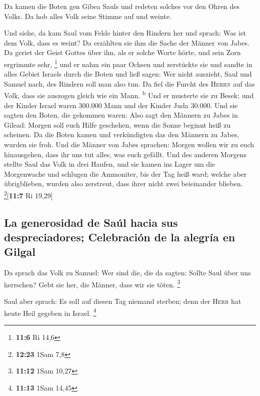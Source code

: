  Da kamen die Boten gen Gibea Sauls und redeten solches
vor den Ohren des Volks. Da hob alles Volk seine Stimme auf und weinte.

 Und siehe, da kam Saul vom Felde hinter den Rindern her
und sprach: Was ist dem Volk, dass es weint? Da erzählten sie ihm die
Sache der Männer von Jabes.  Da geriet der Geist Gottes
über ihn, als er solche Worte hörte, und sein Zorn ergrimmte sehr,
\footnote{\textbf{11:6} Ri 14,6}  und er nahm ein paar
Ochsen und zerstückte sie und sandte in alles Gebiet Israels durch die
Boten und ließ sagen: Wer nicht auszieht, Saul und Samuel nach, des
Rindern soll man also tun. Da fiel die Furcht des \textsc{Herrn} auf das
Volk, dass sie auszogen gleich wie ein Mann. \textsuperscript{b}
 Und er musterte sie zu Besek; und der Kinder Israel waren
300.000 Mann und der Kinder Juda 30.000.  Und sie sagten
den Boten, die gekommen waren: Also sagt den Männern zu Jabes in Gilead:
Morgen soll euch Hilfe geschehen, wenn die Sonne beginnt heiß zu
scheinen. Da die Boten kamen und verkündigten das den Männern zu Jabes,
wurden sie froh.  Und die Männer von Jabes sprachen:
Morgen wollen wir zu euch hinausgehen, dass ihr uns tut alles, was euch
gefällt.  Und des anderen Morgens stellte Saul das Volk
in drei Haufen, und sie kamen ins Lager um die Morgenwache und schlugen
die Ammoniter, bis der Tag heiß ward; welche aber übrigblieben, wurden
also zerstreut, dass ihrer nicht zwei beieinander blieben.
\footnote{\textbf{12:23} 1Sam 7,8}{[}\textbf{11:7} Ri 19,29{]}

\hypertarget{la-generosidad-de-sauxfal-hacia-sus-despreciadores-celebraciuxf3n-de-la-alegruxeda-en-gilgal}{%
\subsection{La generosidad de Saúl hacia sus despreciadores; Celebración
de la alegría en
Gilgal}\label{la-generosidad-de-sauxfal-hacia-sus-despreciadores-celebraciuxf3n-de-la-alegruxeda-en-gilgal}}

 Da sprach das Volk zu Samuel: Wer sind die, die da
sagten: Sollte Saul über uns herrschen? Gebt sie her, die Männer, dass
wir sie töten. \footnote{\textbf{11:12} 1Sam 10,27}

 Saul aber sprach: Es soll auf diesen Tag niemand
sterben; denn der \textsc{Herr} hat heute Heil gegeben in Israel.
\footnote{\textbf{11:13} 1Sam 14,45}

